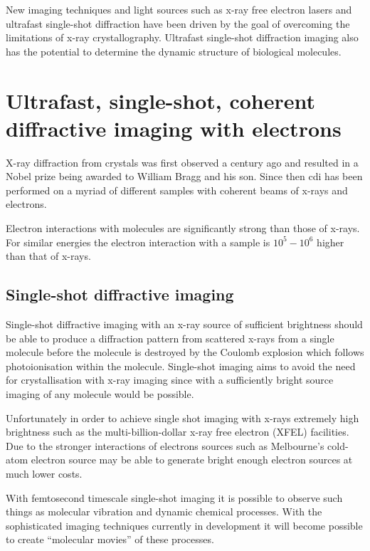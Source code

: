 New imaging techniques and light sources such as x-ray free electron lasers and  ultrafast single-shot diffraction have been driven by the goal of overcoming the limitations of x-ray crystallography. Ultrafast single-shot diffraction imaging also has the potential to determine the dynamic structure of biological molecules.

\section{Ultrafast, single-shot, coherent diffractive imaging with electrons}
X-ray diffraction from crystals was first observed a century ago\cite{bragg_x-rays_1912} and resulted in a Nobel prize being awarded to William Bragg and his son. Since then \gls{cdi} has been performed on a myriad of different samples with coherent beams of x-rays and electrons.

Electron interactions with molecules are significantly strong than those of x-rays. For similar energies the electron interaction with a sample is $10^5-10^6$ higher than that of x-rays\cite{sciaini_femtosecond_2011}.

\subsection{Single-shot diffractive imaging}
Single-shot diffractive imaging with an x-ray source of sufficient brightness should be able to produce a diffraction pattern from scattered x-rays from a single molecule before the molecule is destroyed by the Coulomb explosion which follows photoionisation within the molecule\cite{henderson_potential_1995, neutze_potential_2000}. Single-shot imaging aims to avoid the need for crystallisation with x-ray imaging since with a sufficiently bright source imaging of any molecule would be possible.

Unfortunately in order to achieve single shot imaging with x-rays extremely high brightness such as the multi-billion-dollar x-ray free electron (XFEL) facilities. Due to the stronger interactions of electrons sources such as Melbourne's cold-atom electron source may be able to generate bright enough electron sources at much lower costs.

With femtosecond timescale single-shot imaging it is possible to observe such things as molecular vibration and dynamic chemical processes\cite{zewail_4d_2006}. With the sophisticated imaging techniques currently in development it will become possible to create ``molecular movies''\cite{dwyer_femtosecond_2006} of these processes.


